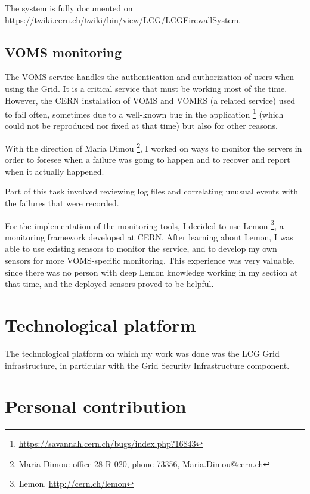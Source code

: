 \documentclass[12pt]{article}
\begin{document}
    The system is fully documented on
    \url{https://twiki.cern.ch/twiki/bin/view/LCG/LCGFirewallSystem}.
    
    \subsection{VOMS monitoring}
    The VOMS service handles the authentication and authorization of users when
    using the Grid.  It is a critical service that must be working most of the
    time.  However, the CERN instalation of VOMS and VOMRS (a related service)
    used to fail often, sometimes due to a well-known bug in the application%
    \footnote{\url{https://savannah.cern.ch/bugs/index.php?16843}}
    (which could not be reproduced nor fixed at that time) but also for other
    reasons.

    With the direction of Maria Dimou%
    \footnote{Maria Dimou: office 28 R-020, phone 73356, \url{Maria.Dimou@cern.ch}},
    I worked on ways to monitor the servers in order to foresee when a failure
    was going to happen and to recover and report when it actually happened.

    Part of this task involved reviewing log files and correlating unusual
    events with the failures that were recorded.

    For the implementation of the monitoring tools, I decided to use Lemon%
    \footnote{Lemon.  \url{http://cern.ch/lemon}},
    a monitoring framework developed at CERN.  After learning about Lemon,
    I was able to use existing sensors to monitor the service, and to develop my
    own sensors for more VOMS-specific monitoring.  This experience was very
    valuable, since there was no person with deep Lemon knowledge working in my
    section at that time, and the deployed sensors proved to be helpful.


  \section{Technological platform}
    The technological platform on which my work was done was the LCG Grid
    infrastructure, in particular with the Grid Security Infrastructure
    component.

    




  \section{Personal contribution}
    
\end{document}
